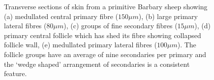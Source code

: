 %

\begin{figure}[h]
  \centering
  \caption{Transverse sections of skin from a primitive Barbary sheep
      showing (a) medullated central primary fibre ($150 \mu m$), (b)
      large primary lateral fibres ($80 \mu m$), (c) groups of fine
      secondary fibres ($15 \mu m$), (d) primary central follicle which
      has shed its fibre showing collapsed follicle wall, (e)
      medullated primary lateral fibres ($100 \mu m$).  The follicle
      groups have an average of nine secondaries per primary and the
      `wedge shaped' arrangement of secondaries is a consistent
      feature. }
  \label{fig:1}
\end{figure}

%
